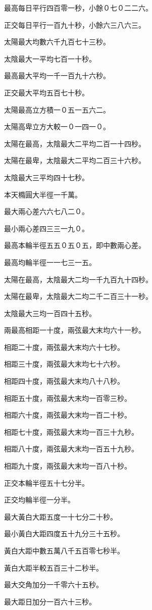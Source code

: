 \begin{pinyinscope}
最高每日平行四百零一秒，小餘０七０二二六。

正交每日平行一百九十秒，小餘六三八六三。

太陽最大均數六千九百七十三秒。

太陰最大一平均七百一十秒。

最高最大平均一千一百九十六秒。

正交最大平均五百七十秒。

太陽最高立方積一０五一五六二。

太陽高卑立方大較一０一四一０。

太陽在最高，太陰最大二平均二百一十四秒。

太陽在最卑，太陰最大二平均二百三十六秒。

太陰最大三平均四十七秒。

本天橢圓大半徑一千萬。

最大兩心差六六七八二０。

最小兩心差四三三一九０。

最高本輪半徑五五０五０五，即中數兩心差。

最高均輪半徑一一七三一五。

太陽在最高，太陰最大二均一千九百九十四秒。

太陽在最卑，太陰最大二均二千二百三十一秒。

太陰最大三均一百四十五秒。

兩最高相距一十度，兩弦最大末均六十一秒。

相距二十度，兩弦最大末均六十七秒。

相距三十度，兩弦最大末均七十六秒。

相距四十度，兩弦最大末均八十八秒。

相距五十度，兩弦最大末均一百零三秒。

相距六十度，兩弦最大末均一百二十秒。

相距七十度，兩弦最大末均一百三十九秒。

相距八十度，兩弦最大末均一百五十九秒。

相距九十度，兩弦最大末均一百八十秒。

正交本輪半徑五十七分半。

正交均輪半徑一分半。

最大黃白大距五度一十七分二十秒。

最小黃白大距四度五十九分三十五秒。

黃白大距中數五萬八千五百零七秒半。

黃白大距半較五百三十二秒半。

最大交角加分一千零六十五秒。

最大距日加分一百六十三秒。


\end{pinyinscope}
